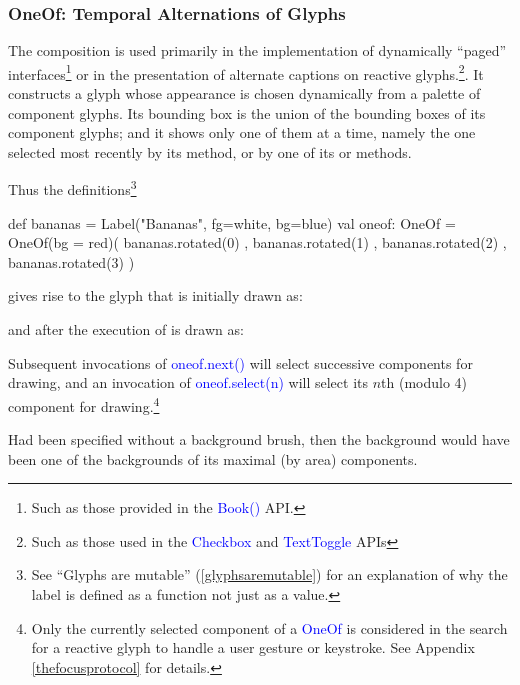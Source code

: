 \documentclass[12pt,a4paper]{article}
\def\Scala#1{\textcolor{blue}{\textsf{#1}}}
\def\SSS#1{\subsubsection*{#1}}
\begin{document}
\clearpage
\SSS{OneOf: Temporal Alternations of Glyphs}
The  composition is used primarily in the implementation of
dynamically ``paged'' interfaces\footnote{Such as those provided in
the \Scala{Book()} API.} or in the presentation of
alternate captions on reactive glyphs.\footnote{Such
as those used in the \Scala{Checkbox} and \Scala{TextToggle} APIs}. It constructs a glyph whose appearance is chosen
dynamically from a palette of component glyphs.
Its bounding box is the union of the bounding boxes of its component glyphs;
and it shows only one of them at a time, namely the one selected most recently by  its  method,
or by one of its  or  methods.

Thus the definitions\footnote{See ``Glyphs are mutable'' (\ref {glyphsaremutable}) for an explanation
of why the label is defined as a function not just as a value.}
\begin{scala}
  def bananas = Label("Bananas", fg=white, bg=blue)
  val oneof: OneOf =
      OneOf(bg = red)( bananas.rotated(0)
                     , bananas.rotated(1)
                     , bananas.rotated(2)
                     , bananas.rotated(3)
                     )
 \end{scala}
gives rise to the glyph that is initially drawn as:
\begin{center}
\end{center}

and after the execution of  is drawn as:
\begin{center}
\end{center}

Subsequent invocations of \Scala{oneof.next()} will select successive components
for drawing, and an invocation of \Scala{oneof.select(n)} will select its $n$th (modulo 4)
component for drawing.\footnote{Only the currently selected component of a
\Scala{OneOf} is considered in the search for a reactive glyph to handle
a user gesture or keystroke. See Appendix \ref{thefocusprotocol} for details.} 

Had  been specified without a background brush, then
the background would have been one of the backgrounds of its
maximal (by area) components.
\begin{center}
\end{center}
\end{document}
